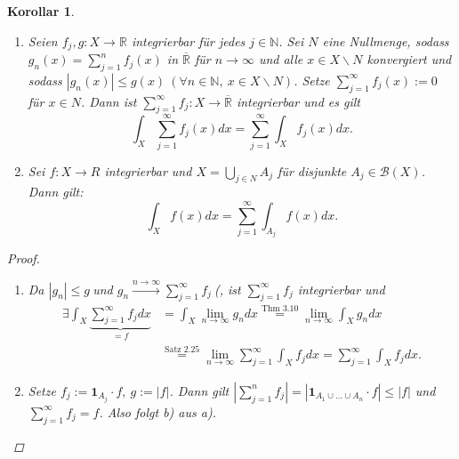 \documentclass[a4paper]{report}
\newcommand{\doubleOne}{\textbf{1}}
\newcommand{\R}{\mathbb{R}}
\newcommand{\Rq}{\overline{\R}}
\newcommand{\N}{\mathbb{N}}
\newcommand{\Borel}{\mathcal{B}}
\newcommand{\toInf}{\rightarrow \infty}
\newcommand{\limToInf}[1]{\lim_{#1 \toInf}}
\newcommand{\jlabel}[1]{\label{j_#1}}
\newcommand{\jshortlink}[1]{\jhyperref{#1}{\text{#1}}}
\newcommand{\jhyperref}[2]{\hyperref[j_#1]{#2}}
\newcommand{\fu}{\text{\textit{(f.ü.)}}}
\newcommand{\jabb}[3]{ #1: #2 \rightarrow #3 }
\theoremstyle{plain}
\newtheorem{kor}[thm]{Korollar}
\theoremstyle{definition}
\begin{document}
{{{{\jlabel{Kor 3.13}
\begin{kor}
    \begin{enumerate}
        \item 
            Seien $\jabb{f_j,g}{X}{\R}$ integrierbar für jedes $j\in\N$. Sei $N$ eine Nullmenge, sodass $g_n(x)=\sum_{j=1}^n f_j(x)$ in $\Rq$ für $n\rightarrow\infty$ und alle $x\in X\backslash N$ konvergiert und sodass $|g_n(x)|\le g(x) \ (\forall n\in\N, \ x\in X\backslash N)$. Setze $\sum_{j=1}^\infty f_j(x) := 0$ für $x \in N$. Dann ist $\jabb{\sum_{j=1}^\infty f_j}{X}{\Rq}$ integrierbar und es gilt 
            \begin{displaymath}
                \int_X \sum_{j=1}^\infty f_j(x) dx = \sum_{j=1}^\infty \int_X f_j(x) dx.
            \end{displaymath}
        \item
            Sei $\jabb{f}{X}{R}$ integrierbar und $X = \bigcup_{j\in N} A_j$ für disjunkte $A_j \in \Borel(X)$. Dann gilt:
            \begin{displaymath}
                \int_X f(x) dx = \sum_{j=1}^\infty \int_{A_j} f(x) dx.
            \end{displaymath}
    \end{enumerate}
    \begin{proof}
        \begin{enumerate}
            \item
                Da $|g_n| \le g \ $\fu und $g_n \xrightarrow{n\rightarrow \infty} \sum_{j=1}^\infty f_j \ $(\fu, ist $\sum_{j=1}^\infty f_j$ integrierbar und 
                \begin{displaymath}
                    \begin{split}
                        \exists \int_X \underbrace{\sum_{j=1}^\infty f_j dx}_{=f} &= \int_X \limToInf{n} g_n dx \overset{\jshortlink{Thm 3.10}}{=} \limToInf{n} \int_X g_n dx \\
                        &\overset{\jshortlink{Satz 2.25}}{=} \limToInf{n} \sum_{j=1}^\infty \int_X f_j dx = \sum_{j=1}^\infty \int_X f_j dx.
                    \end{split}
                \end{displaymath}
                
            \item
                Setze $f_j := \doubleOne_{A_j} \cdot f, \ g := |f|$. Dann gilt $|\sum_{j=1}^n f_j| = |\doubleOne_{A_1 \cup \dots \cup A_n} \cdot f| \le |f|$ und $\sum_{j=1}^\infty f_j = f$. Also folgt b) aus a).
        \end{enumerate}
    \end{proof}
\end{kor}

}}}}
\end{document}
